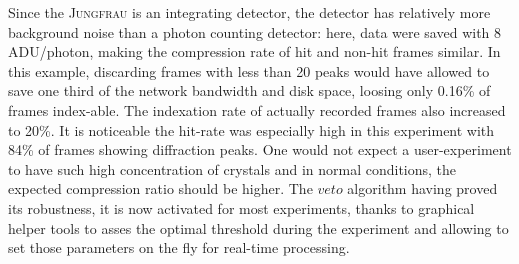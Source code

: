 \documentclass[preprint]{iucr}              %
\begin{document}

Since the \textsc{Jungfrau} is an integrating detector, the detector has relatively more background noise than a photon counting detector: here, data were saved with 8 ADU/photon, making the compression rate of hit and non-hit frames similar.
In this example, discarding frames with less than 20 peaks would have allowed to save one third of the network bandwidth and disk space, loosing only 0.16\% of frames index-able. 
The indexation rate of actually recorded frames also increased to 20\%.
It is noticeable the hit-rate was especially high in this experiment with 84\% of frames showing diffraction peaks.
One would not expect a user-experiment to have such high concentration of crystals and in normal conditions, the expected compression ratio should be higher.
The $veto$ algorithm having proved its robustness, it is now activated for most experiments, thanks to graphical helper tools to asses the optimal threshold during the experiment and allowing to set those parameters on the fly for real-time processing.
\end{document}
